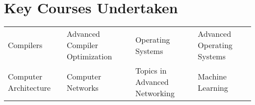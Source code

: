 \documentclass[10pt]{article}
\begin{document}
\section*{Key Courses Undertaken}


\begin{table}[h]
\begin{tabular}{llll}
Compilers & Advanced Compiler Optimization & Operating Systems & Advanced Operating Systems \\
Computer Architecture & Computer Networks & Topics in Advanced Networking & Machine Learning \\
\end{tabular}
\end{table}
\end{document}
